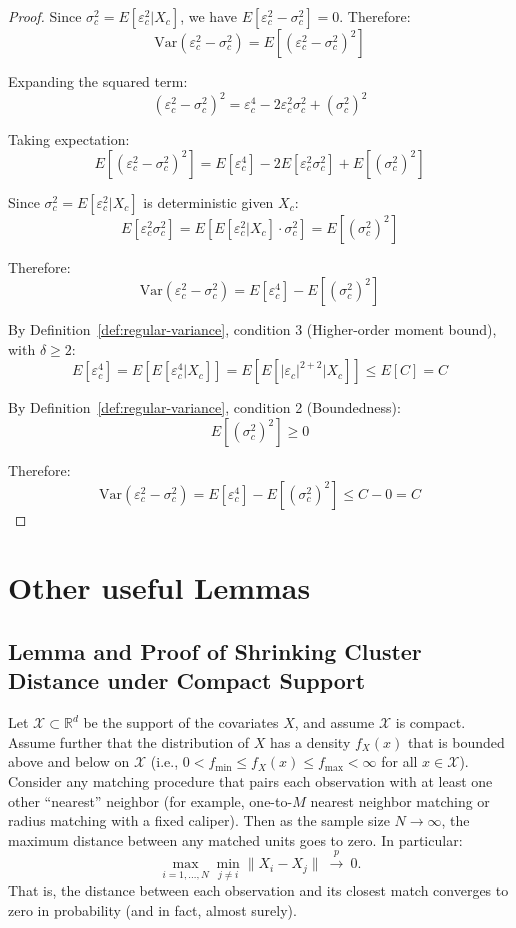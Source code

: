 \documentclass{mytemplate}
\begin{document}
\begin{proof}
Since $\sigma_c^2 = E[\varepsilon_c^2 | X_c]$, we have $E[\varepsilon_c^2 - \sigma_c^2] = 0$. Therefore:
$$\text{Var}(\varepsilon_c^2 - \sigma_c^2) = E[(\varepsilon_c^2 - \sigma_c^2)^2]$$

Expanding the squared term:
$$(\varepsilon_c^2 - \sigma_c^2)^2 = \varepsilon_c^4 - 2\varepsilon_c^2\sigma_c^2 + (\sigma_c^2)^2$$

Taking expectation:
$$E[(\varepsilon_c^2 - \sigma_c^2)^2] = E[\varepsilon_c^4] - 2E[\varepsilon_c^2\sigma_c^2] + E[(\sigma_c^2)^2]$$

Since $\sigma_c^2 = E[\varepsilon_c^2 | X_c]$ is deterministic given $X_c$:
$$E[\varepsilon_c^2\sigma_c^2] = E[E[\varepsilon_c^2 | X_c] \cdot \sigma_c^2] = E[(\sigma_c^2)^2]$$

Therefore:
$$\text{Var}(\varepsilon_c^2 - \sigma_c^2) = E[\varepsilon_c^4] - E[(\sigma_c^2)^2]$$

By Definition~\ref{def:regular-variance}, condition 3 (Higher-order moment bound), with $\delta \geq 2$:
$$E[\varepsilon_c^4] = E[E[\varepsilon_c^4 | X_c]] = E[E[|\varepsilon_c|^{2+2} | X_c]] \leq E[C] = C$$

By Definition~\ref{def:regular-variance}, condition 2 (Boundedness):
$$E[(\sigma_c^2)^2] \geq 0$$

Therefore:
$$\text{Var}(\varepsilon_c^2 - \sigma_c^2) = E[\varepsilon_c^4] - E[(\sigma_c^2)^2] \leq C - 0 = C$$
\end{proof}


\section{Other useful Lemmas}



\subsection{Lemma and Proof of Shrinking Cluster Distance under Compact Support}

\begin{lemma}\label{lemma:shrinking}
Let $\mathcal{X}\subset\mathbb{R}^d$ be the support of the covariates $X$, and assume $\mathcal{X}$ is compact. Assume further that the distribution of $X$ has a density $f_X(x)$ that is bounded above and below on $\mathcal{X}$ (i.e., $0 < f_{\min} \le f_X(x)\le f_{\max} < \infty$ for all $x\in\mathcal{X}$). Consider any matching procedure that pairs each observation with at least one other “nearest” neighbor (for example, one-to-$M$ nearest neighbor matching or radius matching with a fixed caliper). Then as the sample size $N\to\infty$, the maximum distance between any matched units goes to zero. In particular:
$$
\max_{i=1,\dots,N} \min_{j \neq i} \|X_i - X_j\| ~\xrightarrow{p}~ 0.
$$ 
That is, the distance between each observation and its closest match converges to zero in probability (and in fact, almost surely).
\end{lemma}
\end{document}
